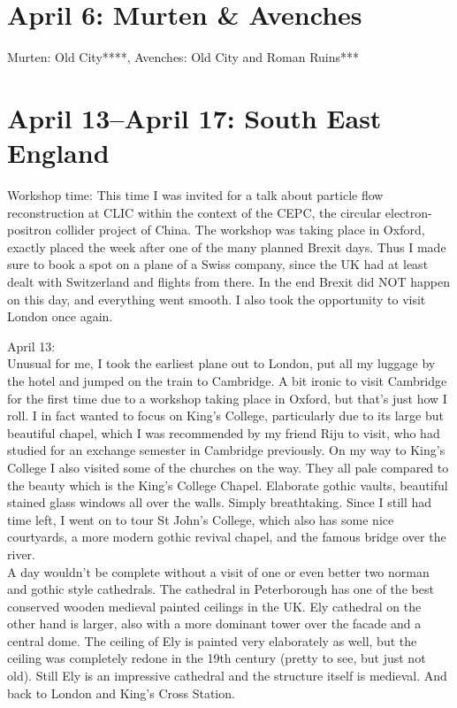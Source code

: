 \section{April 6: Murten \& Avenches}
\label{Birthday2019}

Murten: Old City****, Avenches: Old City and Roman Ruins***

\section{April 13--April 17: South East England}
\label{2019SouthEastEngland}

Workshop time: This time I was invited for a talk about particle flow reconstruction at CLIC within the context of the CEPC, the circular electron-positron collider project of China. The workshop was taking place in Oxford, exactly placed the week after one of the many planned Brexit days. Thus I made sure to book a spot on a plane of a Swiss company, since the UK had at least dealt with Switzerland and flights from there. In the end Brexit did NOT happen on this day, and everything went smooth. I also took the opportunity to visit London once again.

April 13:\\
Unusual for me, I took the earliest plane out to London, put all my luggage by the hotel and jumped on the train to Cambridge. A bit ironic to visit Cambridge for the first time due to a workshop taking place in Oxford, but that's just how I roll. I in fact wanted to focus on King's College, particularly due to its large but beautiful chapel, which I was recommended by my friend Riju to visit, who had studied for an exchange semester in Cambridge previously. On my way to King's College I also visited some of the churches on the way. They all pale compared to the beauty which is the King's College Chapel. Elaborate gothic vaults, beautiful stained glass windows all over the walls. Simply breathtaking. Since I still had time left, I went on to tour St John's College, which also has some nice courtyards, a more modern gothic revival chapel, and the famous bridge over the river.\\
A day wouldn't be complete without a visit of one or even better two norman and gothic style cathedrals. The cathedral in Peterborough has one of the best conserved wooden medieval painted ceilings in the UK. Ely cathedral on the other hand is larger, also with a more dominant tower over the facade and a central dome. The ceiling of Ely is painted very elaborately as well, but the ceiling was completely redone in the 19th century (pretty to see, but just not old). Still Ely is an impressive cathedral and the structure itself is medieval. And back to London and King's Cross Station.\\

